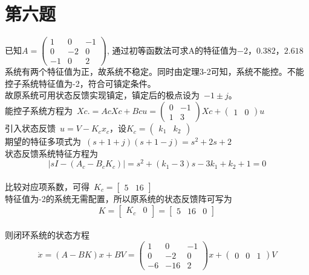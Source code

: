 \documentclass[a4paper]{article}
\begin{document}
\section*{第六题}
已知$A=\left(\begin{array}{ccc} 1 & 0 & -1\\ 0 & -2 & 0\\ -1 & 0 & 2 \end{array}\right)$, 通过初等函数法可求A的特征值为$ -2， 0.382， 2.618$ \\
系统有两个特征值为正，故系统不稳定。同时由定理3-2可知，系统不能控。不能控子系统特征值为-2，符合可镇定条件。 \\
\mbox{故原系统可用状态反馈实现镇定，镇定后的极点设为 }$ -1 \pm j $。 \\
\mbox{能控子系统方程为 }$Xc.=AcXc+Bcu= \left(\begin{array}{cc} 0 & -1\\ 1 & 3 \end{array}\right)Xc+\left(\begin{array}{cc} 1 & 0 \end{array}\right)u$ \\
\mbox{引入状态反馈 }$u=V-K_cx_c$，设$ K_c=\left(\begin{array}{cc} k_1 & k_2 \end{array}\right) $ \\
\mbox{期望的特征多项式为 }$ (s+1+j)(s+1-j)=s^2+2s+2 $ \\
状态反馈系统特征方程为 \\
$$ \left|sI-(A_c-B_cK_c)\right|=s^2+(k_1-3)s-3k_1+k_2+1=0 $$ \\
\mbox{比较对应项系数，可得 }$K_c=\left[\begin{array}{cc} 5 & 16 \end{array}\right] $ \\
特征值为-2的系统无需配置，所以原系统的状态反馈阵可写为 \\
$$ K=\left[\begin{array}{cc} K_c & 0 \end{array}\right]=\left[\begin{array}{ccc} 5 & 16 & 0 \end{array}\right] $$\\
则闭环系统的状态方程
$$ \dot{x}=(A-BK)x+BV= \left(\begin{array}{ccc} 1 & 0 & -1\\ 0 & -2 & 0\\ -6 & -16 & 2 \end{array}\right)x+\left(\begin{array}{ccc} 0 & 0 & 1 \end{array}\right)V $$ \\
\end{document}
